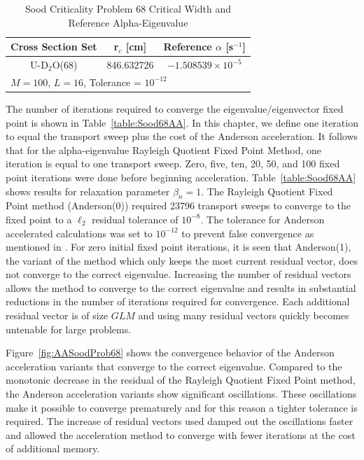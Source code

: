 \begin{table}[b]
\caption{Sood Criticality Problem 68 Critical Width and Reference Alpha-Eigenvalue \cite{sood2003analytical}}
	\label{table:Sood68Ref}
	\begin{subtable}[h]{1.0\textwidth}
	\centering{}
	\begin{tabular}{@{}ccc@{}}\toprule
	Cross Section Set & r$_{c}$ [cm] & Reference $\alpha$ [s$^{-1}$] \\
	\midrule
	U-D$_{2}$O(68) & 846.632726 & $-1.508539 \times 10^{-5}$ \\
	\bottomrule%
	\multicolumn{3}{l}{$M = 100$, $L = 16$, Tolerance = $10^{-12}$} \\
	\end{tabular}
	\end{subtable}%
\end{table}

The number of iterations required to converge the eigenvalue/eigenvector fixed point is shown in Table~\ref{table:Sood68AA}. In this chapter, we define one iteration to equal the transport sweep plus the cost of the Anderson acceleration. It follows that for the alpha-eigenvalue Rayleigh Quotient Fixed Point Method, one iteration is equal to one transport sweep. Zero, five, ten, 20, 50, and 100 fixed point iterations were done before beginning acceleration. Table~\ref{table:Sood68AA} shows results for relaxation parameter $\beta_{n} = 1$. The Rayleigh Quotient Fixed Point method (Anderson(0)) required 23796 transport sweeps to converge to the fixed point to a $\ell_{2}$ residual tolerance of $10^{-8}$. The tolerance for Anderson accelerated calculations was set to $10^{-12}$ to prevent false convergence as mentioned in \cite{walker_anderson_2011}. For zero initial fixed point iterations, it is seen that Anderson(1), the variant of the method which only keeps the most current residual vector, does not converge to the correct eigenvalue. Increasing the number of residual vectors allows the method to converge to the correct eigenvalue and results in substantial reductions in the number of iterations required for convergence. Each additional residual vector is of size $GLM$ and using many residual vectors quickly becomes untenable for large problems. 

Figure~\ref{fig:AASoodProb68} shows the convergence behavior of the Anderson acceleration variants that converge to the correct eigenvalue. Compared to the monotonic decrease in the residual of the Rayleigh Quotient Fixed Point method, the Anderson acceleration variants show significant oscillations. These oscillations make it possible to converge prematurely and for this reason a tighter tolerance is required. The increase of residual vectors used damped out the oscillations faster and allowed the acceleration method to converge with fewer iterations at the cost of additional memory.

